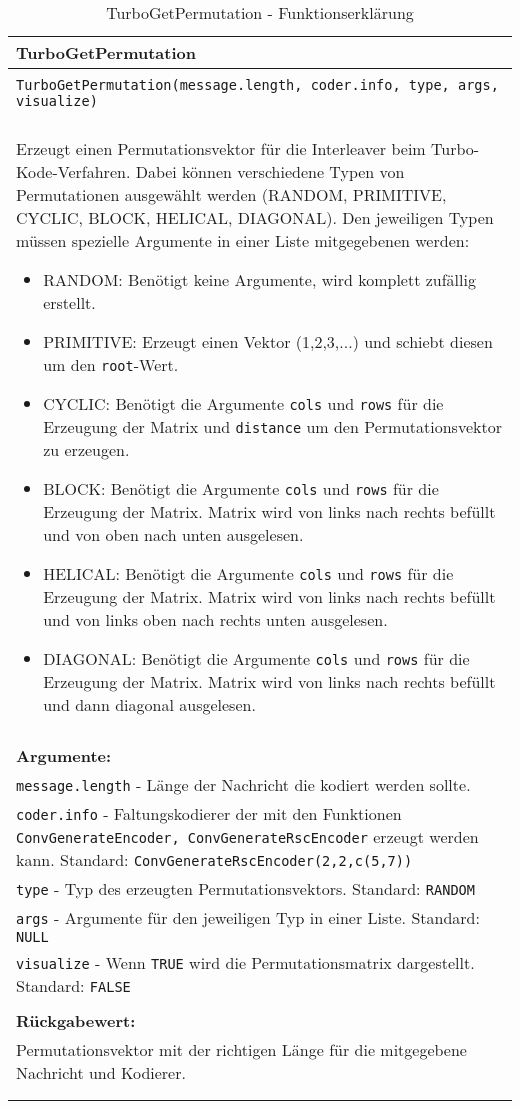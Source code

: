 \begin{longtable}{|p{\textwidth}|}
\hline
\rowcolor{lightblue}TurboGetPermutation\\
\hline
\\
\texttt{TurboGetPermutation(message.length, coder.info, type, args, visualize)}\\
\\
Erzeugt einen Permutationsvektor für die Interleaver beim Turbo-Kode-Verfahren. Dabei können verschiedene Typen von Permutationen ausgewählt werden (RANDOM, PRIMITIVE, CYCLIC, BLOCK, HELICAL, DIAGONAL). Den jeweiligen Typen müssen spezielle Argumente in einer Liste mitgegebenen werden:
\begin{itemize}
\item RANDOM: Benötigt keine Argumente, wird komplett zufällig erstellt.
\item PRIMITIVE: Erzeugt einen Vektor (1,2,3,...) und schiebt diesen um den \texttt{root}-Wert.
\item CYCLIC: Benötigt die Argumente \texttt{cols} und \texttt{rows} für die Erzeugung der Matrix und \texttt{distance} um den Permutationsvektor zu erzeugen.
\item BLOCK: Benötigt die Argumente \texttt{cols} und \texttt{rows} für die Erzeugung der Matrix. Matrix wird von links nach rechts befüllt und von oben nach unten ausgelesen.
\item HELICAL: Benötigt die Argumente \texttt{cols} und \texttt{rows} für die Erzeugung der Matrix. Matrix wird von links nach rechts befüllt und von links oben nach rechts unten ausgelesen.
\item DIAGONAL: Benötigt die Argumente \texttt{cols} und \texttt{rows} für die Erzeugung der Matrix. Matrix wird von links nach rechts befüllt und dann diagonal ausgelesen.
\end{itemize} \\
\\
\textbf{Argumente:}\\
\texttt{message.length} - Länge der Nachricht die kodiert werden sollte.\\
\texttt{coder.info} - Faltungskodierer der mit den Funktionen \texttt{ConvGenerateEncoder, ConvGenerateRscEncoder} erzeugt werden kann. Standard: \texttt{ConvGenerateRscEncoder(2,2,c(5,7))}\\
\texttt{type} - Typ des erzeugten Permutationsvektors. Standard: \texttt{RANDOM}\\
\texttt{args} - Argumente für den jeweiligen Typ in einer Liste. Standard: \texttt{NULL}\\
\texttt{visualize} - Wenn \texttt{TRUE} wird die Permutationsmatrix dargestellt. Standard: \texttt{FALSE}\\
\\
\textbf{Rückgabewert:}\\
Permutationsvektor mit der richtigen Länge für die mitgegebene Nachricht und Kodierer.\\
\\
\hline
\caption[TurboGetPermutation]{TurboGetPermutation - Funktionserklärung}
\end{longtable}